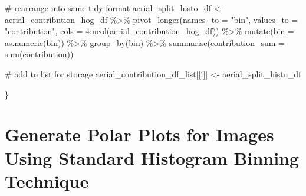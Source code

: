\documentclass[
  letterpaper,
  DIV=11,
  numbers=noendperiod]{scrreprt}
\newenvironment{Shaded}{\begin{snugshade}}{\end{snugshade}}
\newcommand{\AttributeTok}[1]{\textcolor[rgb]{0.40,0.45,0.13}{#1}}
\newcommand{\CommentTok}[1]{\textcolor[rgb]{0.37,0.37,0.37}{#1}}
\newcommand{\DecValTok}[1]{\textcolor[rgb]{0.68,0.00,0.00}{#1}}
\newcommand{\FunctionTok}[1]{\textcolor[rgb]{0.28,0.35,0.67}{#1}}
\newcommand{\NormalTok}[1]{\textcolor[rgb]{0.00,0.23,0.31}{#1}}
\newcommand{\OtherTok}[1]{\textcolor[rgb]{0.00,0.23,0.31}{#1}}
\newcommand{\SpecialCharTok}[1]{\textcolor[rgb]{0.37,0.37,0.37}{#1}}
\newcommand{\StringTok}[1]{\textcolor[rgb]{0.13,0.47,0.30}{#1}}
\begin{document}
\begin{Shaded}
\begin{Highlighting}[]
  \CommentTok{\# rearrange into same tidy format}
\NormalTok{  aerial\_split\_histo\_df }\OtherTok{\textless{}{-}} 
\NormalTok{    aerial\_contribution\_hog\_df }\SpecialCharTok{\%\textgreater{}\%}
    \FunctionTok{pivot\_longer}\NormalTok{(}\AttributeTok{names\_to =} \StringTok{"bin"}\NormalTok{, }
                 \AttributeTok{values\_to =} \StringTok{"contribution"}\NormalTok{, }
                 \AttributeTok{cols =} \DecValTok{4}\SpecialCharTok{:}\FunctionTok{ncol}\NormalTok{(aerial\_contribution\_hog\_df)) }\SpecialCharTok{\%\textgreater{}\%}
    \FunctionTok{mutate}\NormalTok{(}\AttributeTok{bin =} \FunctionTok{as.numeric}\NormalTok{(bin)) }\SpecialCharTok{\%\textgreater{}\%}
    \FunctionTok{group\_by}\NormalTok{(bin) }\SpecialCharTok{\%\textgreater{}\%}
    \FunctionTok{summarise}\NormalTok{(}\AttributeTok{contribution\_sum =} \FunctionTok{sum}\NormalTok{(contribution))}
  
  \CommentTok{\# add to list for storage}
\NormalTok{  aerial\_contribution\_df\_list[[i]] }\OtherTok{\textless{}{-}}\NormalTok{ aerial\_split\_histo\_df}

\NormalTok{\}}
\end{Highlighting}
\end{Shaded}

\section{Generate Polar Plots for Images Using Standard Histogram
Binning
Technique}\label{generate-polar-plots-for-images-using-standard-histogram-binning-technique}
\end{document}
